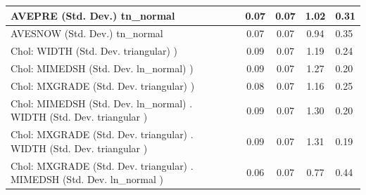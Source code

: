 \begin{table}
\begin{center}
\begin{tabular}{|l|l|c|c|c|l|}
			\hline
			AVEPRE (Std. Dev.) tn_normal &  & 0.07 & 0.07 & 1.02 & 0.31 \\
			\hline
			AVESNOW (Std. Dev.) tn_normal &  & 0.07 & 0.07 & 0.94 & 0.35 \\
			\hline
			 Chol: WIDTH (Std. Dev. triangular) ) &  & 0.09 & 0.07 & 1.19 & 0.24 \\
			\hline
			 Chol: MIMEDSH (Std. Dev. ln_normal) ) &  & 0.09 & 0.07 & 1.27 & 0.20 \\
			\hline
			 Chol: MXGRADE (Std. Dev. triangular) ) &  & 0.08 & 0.07 & 1.16 & 0.25 \\
			\hline
			 Chol: MIMEDSH (Std. Dev. ln_normal) . WIDTH (Std. Dev.   triangular ) &  & 0.09 & 0.07 & 1.30 & 0.20 \\
			\hline
			 Chol: MXGRADE (Std. Dev. triangular) . WIDTH (Std. Dev.   triangular ) &  & 0.09 & 0.07 & 1.31 & 0.19 \\
			\hline
			 Chol: MXGRADE (Std. Dev. triangular) . MIMEDSH (Std. Dev.   ln_normal ) &  & 0.06 & 0.07 & 0.77 & 0.44 \\
			\hline
		\end{tabular}
	\end{center}
\end{table}